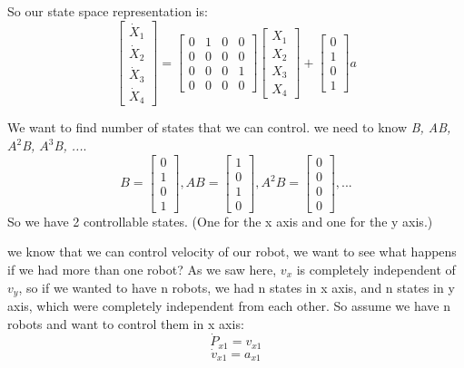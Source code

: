 \documentclass[10pt,letterpaper]{article}
\begin{document}
So our state space representation is:
\begin{equation}
\begin{bmatrix}
\dot{X}_1\\ 
\dot{X}_2\\
\dot{X}_3\\
\dot{X}_4
\end{bmatrix} = \begin{bmatrix}
0 & 1 & 0 & 0 \\
0 & 0 & 0 & 0\\
0 & 0 & 0 & 1\\
0 & 0 & 0 & 0
\end{bmatrix}  \begin{bmatrix}
X_1\\
X_2\\
X_3\\
X_4
\end{bmatrix} + \begin{bmatrix}
0\\
1\\
0\\
1
\end{bmatrix} a
\end{equation}

We want to find number of states that we can control. we need to know \emph{B, AB,$A^2$B, $A^3$B, ...}.
\begin{equation}
 B= \begin{bmatrix} 
0\\
1\\
0\\
1
\end{bmatrix}
,
 AB= \begin{bmatrix} 
1\\
0\\
1\\
0
\end{bmatrix}
,
 A^2B= \begin{bmatrix} 
0\\
0\\
0\\
0
\end{bmatrix}, ...
\end{equation}
So we have 2 controllable states. (One for the x axis and one for the y axis.)

we know that we can control velocity of our robot, we want to see what happens if we had more than one robot? As we saw here, $v_x$ is completely independent of $v_y$, so if we wanted to have n robots, we had n states in x axis, and n states in y axis, which were completely independent from each other. So assume we have n robots and want to control them in x axis:\\
\begin{equation}
\dot{P}_{x1} = v_{x1}
\end{equation}
\begin{equation}
\dot{v}_{x1} = a_{x1}
\end{equation}
\end{document}
